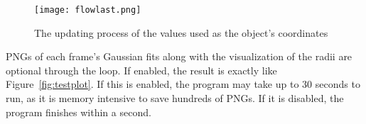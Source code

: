 \begin{figure}[htpb]
	\centering
	\texttt{[image: flowlast.png]}
	\caption{The updating process of the values used as the object's coordinates}
	\label{fig:updatingxy}
\end{figure}

PNGs of each frame's Gaussian fits along with the visualization of the radii are optional through the loop. If enabled, the result is exactly like Figure~\ref{fig:testplot}. If this is enabled, the program may take up to 30 seconds to run, as it is memory intensive to save hundreds of PNGs. If it is disabled, the program finishes within a second.





